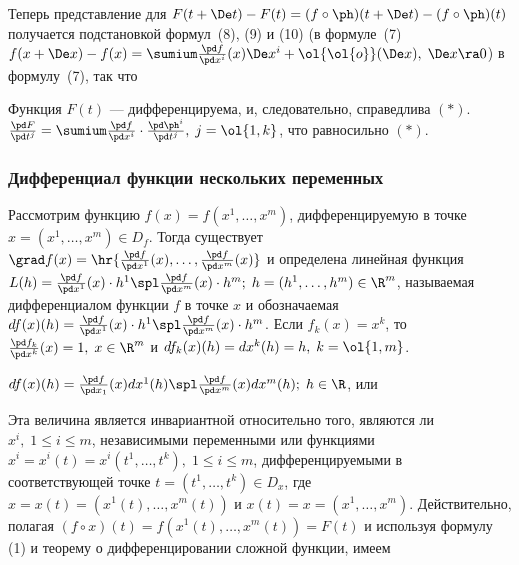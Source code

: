 \documentclass[a4paper]{article}
\begin{document}
Теперь представление для $F(t+\De t) - F(t) = (f\circ\ph)(t+\De t) -
(f\circ\ph)(t)$ получается подстановкой формул~(8), (9) и (10) (в
формуле~(7) $f(x+\De x)-f(x) = \sumium \frac{\pd f}{\pd x^i} (x) \De
x^i + \ol{\ol{o}}(\De x), \; \De x\ra0$) в формулу~(7), так что

Функция $F(t)$ --- дифференцируема, и, следовательно, справедлива
$(*)$. $\frac{\pd F}{\pd t^j} = \sumium \frac{\pd f}{\pd x^i}\cdot
\frac{\pd \ph^i}{\pd t^j}, \; j=\ol{1,k}$, что равносильно $(*)$.

\subsubsection{ Дифференциал функции нескольких переменных}

Рассмотрим функцию $f(x)=f(x^1,\ldots,x^m)$, дифференцируемую в
точке $x=(x^1,\ldots,x^m)\in D_f$. Тогда существует $\grad f(x) =
\hr{\frac{\pd f}{\pd x^1}(x), \ldots, \frac{\pd f}{\pd x^m}(x)}$ и
определена линейная функция $L(h) = \frac{\pd f}{\pd x^1}(x)\cdot
h^1 \spl \frac{\pd f}{\pd x^m}(x)\cdot h^m; \;
h=(h^1,\ldots,h^m)\in\R^m$, называемая дифференциалом функции $f$ в
точке $x$ и обозначаемая $df(x)(h) = \frac{\pd f}{\pd x^1}(x)\cdot
h^1 \spl \frac{\pd f}{\pd x^m}(x)\cdot h^m$. Если
$f_k(x)=x^k$, то $\frac{\pd f_k}{\pd x^k}(x) = 1, \; x\in\R^m$ и
$df_k(x)(h) = dx^k(h) = h, \; k=\ol{1,m}$.

$df(x)(h) = \frac{\pd f}{\pd x_1}(x) dx^1(h) \spl \frac{\pd f}{\pd
x^m}(x)dx^m(h); \; h\in\R$, или  

Эта величина является инвариантной относительно того, являются ли
$x^i, \; 1\le i \le m$, независимыми переменными или функциями
$x^i=x^i(t) = x^i(t^1,\ldots,t^k), \; 1\le i\le m$,
дифференцируемыми в соответствующей точке $t=(t^1,\ldots,t^k)\in
D_x$, где $x=x(t) = (x^1(t),\ldots,x^m(t))$ и
$x(t)=x=(x^1,\ldots,x^m)$. Действительно, полагая $(f\circ x)(t) =
f(x^1(t),\ldots,x^m(t)) = F(t)$ и используя формулу (1) и теорему о
дифференцировании сложной функции, имеем 
\end{document}

